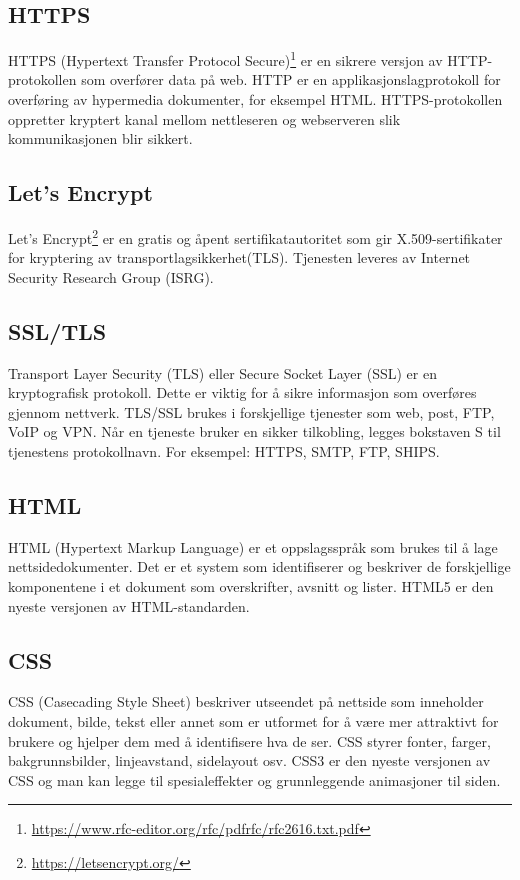 \subsection{HTTPS}
HTTPS (Hypertext Transfer Protocol Secure)\footnote{\url{https://www.rfc-editor.org/rfc/pdfrfc/rfc2616.txt.pdf}} er en sikrere versjon av HTTP-protokollen som overfører data på web. HTTP er en applikasjonslagprotokoll for overføring av hypermedia dokumenter, for eksempel HTML. HTTPS-protokollen oppretter kryptert kanal mellom nettleseren og webserveren slik  kommunikasjonen blir sikkert. 

\subsection{Let’s Encrypt}
Let’s Encrypt\footnote{\url{https://letsencrypt.org/}} er en gratis og åpent sertifikatautoritet som gir X.509-sertifikater for kryptering av transportlagsikkerhet(TLS). Tjenesten leveres av Internet Security Research Group (ISRG).

\subsection{SSL/TLS}
Transport Layer Security (TLS) eller Secure Socket Layer (SSL) er en kryptografisk protokoll. Dette er viktig for å sikre informasjon som overføres gjennom nettverk. TLS/SSL brukes i forskjellige tjenester som web, post, FTP, VoIP og VPN.
Når en tjeneste bruker en sikker tilkobling, legges bokstaven S til tjenestens protokollnavn. For eksempel: HTTPS, SMTP, FTP, SHIPS.

\subsection{HTML}
HTML (Hypertext Markup Language) er et oppslagsspråk som brukes til å lage nettsidedokumenter. Det er et system som identifiserer og beskriver de forskjellige komponentene i et dokument som overskrifter, avsnitt og lister. HTML5 er den nyeste versjonen av HTML-standarden.

\subsection{CSS}
CSS (Casecading Style Sheet) beskriver utseendet på nettside som inneholder dokument, bilde, tekst eller annet som er utformet for å være mer attraktivt for brukere og hjelper dem med å identifisere hva de ser. CSS styrer fonter, farger, bakgrunnsbilder, linjeavstand, sidelayout osv. CSS3 er den nyeste versjonen av CSS og man kan legge til spesialeffekter og grunnleggende animasjoner til siden.


